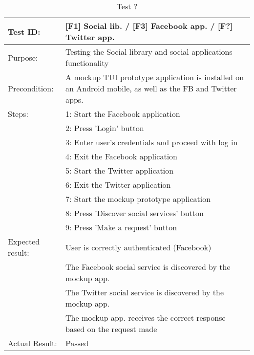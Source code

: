 \begin{table}[h!]
\begin{tabular}{|l|p{10cm}|}
\hline Test ID: &		[F1] Social lib. / [F3] Facebook app. / [F?] Twitter app.\\
\hline Purpose: &		Testing the Social library and social applications
						functionality \\
\hline Precondition: &	A mockup TUI prototype application is installed on an
						Android mobile, as well as the FB and Twitter apps. \\
\hline
Steps:
 & 1: Start the Facebook application \\
 & 2: Press 'Login' button \\
 & 3: Enter user's credentials and proceed with log in \\
 & 4: Exit the Facebook application \\
 & 5: Start the Twitter application \\
 & 6: Exit the Twitter application \\
 & 7: Start the mockup prototype application \\
 & 8: Press 'Discover social services' button \\
 & 9: Press 'Make a request' button \\
\hline
Expected result:
 & User is correctly authenticated (Facebook) \\
 & The Facebook social service is discovered by the mockup app. \\
 & The Twitter social service is discovered by the mockup app. \\
 & The mockup app. receives the correct response based on the request made \\
\hline
Actual Result:
 & Passed \\
\hline
\end{tabular}
\caption{Test ?}
\end{table}

